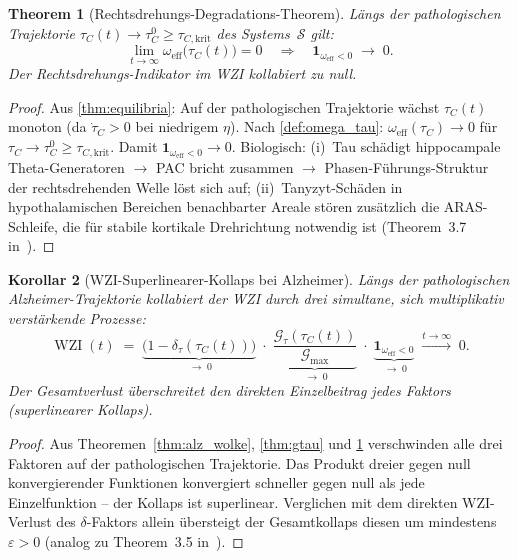 ﻿\documentclass[12pt,a4paper]{article}
\newtheorem{theorem}{Theorem}[section]
\newtheorem{corollary}[theorem]{Korollar}
\theoremstyle{definition}
\DeclareMathOperator{\WZI}{WZI}
\begin{document}
	\begin{theorem}[Rechtsdrehungs-Degradations-Theorem]
		\label{thm:rotation_tau}
		Längs der pathologischen Trajektorie $\tau_C(t) \to \tau_C^0 \geq \tau_{C,\mathrm{krit}}$
		des Systems~$\mathcal{S}$ gilt:
		\[
			\lim_{t \to \infty} \omega_{\mathrm{eff}}\bigl(\tau_C(t)\bigr) = 0
			\quad\Rightarrow\quad
			\mathbf{1}_{\omega_{\mathrm{eff}} < 0} \;\to\; 0.
		\]
		Der Rechtsdrehungs-Indikator im WZI kollabiert zu null.
	\end{theorem}

	\begin{proof}
		Aus \cref{thm:equilibria}: Auf der pathologischen Trajektorie wächst
		$\tau_C(t)$ monoton (da $\dot{\tau}_C > 0$ bei niedrigem $\eta$). Nach
		\cref{def:omega_tau}: $\omega_{\mathrm{eff}}(\tau_C) \to 0$ für
		$\tau_C \to \tau_C^0 \geq \tau_{C,\mathrm{krit}}$. Damit
		$\mathbf{1}_{\omega_{\mathrm{eff}} < 0} \to 0$.
		Biologisch: (i)~Tau schädigt hippocampale Theta-Generatoren $\to$ PAC bricht zusammen
		$\to$ Phasen-Führungs-Struktur der rechtsdrehenden Welle löst sich auf;
		(ii)~Tanyzyt-Schäden in hypothalamischen Bereichen benachbarter Areale stören
		zusätzlich die ARAS-Schleife, die für stabile kortikale Drehrichtung notwendig ist
		(Theorem~3.7 in~\cite{Epp2026brn}).
	\end{proof}

	\begin{corollary}[WZI-Superlinearer-Kollaps bei Alzheimer]
		\label{cor:wzi_collapse}
		Längs der pathologischen Alzheimer-Trajektorie kollabiert der WZI
		durch drei simultane, sich multiplikativ verstärkende Prozesse:
		\[
			\WZI(t) \;=\;
			\underbrace{\bigl(1 - \delta_\tau(\tau_C(t))\bigr)}_{\;\to\; 0}
			\;\cdot\;
			\underbrace{\dfrac{\mathcal{G}_\tau(\tau_C(t))}{\mathcal{G}_{\max}}}_{\;\to\; 0}
			\;\cdot\;
			\underbrace{\mathbf{1}_{\omega_{\mathrm{eff}} < 0}}_{\;\to\; 0}
			\;\xrightarrow{t\to\infty}\; 0.
		\]
		Der Gesamtverlust überschreitet den direkten Einzelbeitrag jedes Faktors
		(superlinearer Kollaps).
	\end{corollary}

	\begin{proof}
		Aus Theoremen~\ref{thm:alz_wolke}, \ref{thm:gtau} und \ref{thm:rotation_tau}
		verschwinden alle drei Faktoren auf der pathologischen Trajektorie.
		Das Produkt dreier gegen null konvergierender Funktionen konvergiert schneller
		gegen null als jede Einzelfunktion -- der Kollaps ist superlinear. Verglichen mit
		dem direkten WZI-Verlust des $\delta$-Faktors allein übersteigt der Gesamtkollaps
		diesen um mindestens $\varepsilon > 0$ (analog zu Theorem~3.5 in~\cite{Epp2026brn}).
		
	\end{proof}
\end{document}
